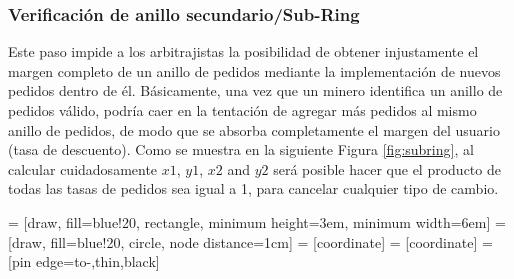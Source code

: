 \documentclass[UTF8,nofonts]{article}
\makeatletter
\newenvironment{figurehere}
 {\def\@captype{figure}}
 {}
\makeatother
\begin{document}
\begin{multicols}{2}
\subsubsection{Verificaci\'on de anillo secundario/Sub-Ring\label{sec:sub_ring_check}}
Este paso impide a los arbitrajistas la posibilidad de obtener injustamente el margen completo de un anillo de pedidos mediante la implementaci\'on de nuevos pedidos dentro de \'el. B\'asicamente, una vez que un minero identifica un anillo de pedidos v\'alido, podr\'ia caer en la tentaci\'on de agregar m\'as pedidos al mismo anillo de pedidos, de modo que se absorba completamente el margen del usuario (tasa de descuento). Como se muestra en la siguiente Figura \ref{fig:subring}, al calcular cuidadosamente $x1$, $y1$, $x2$ and $y2$ ser\'a posible hacer que el producto de todas las tasas de pedidos sea igual a 1, para cancelar cualquier tipo de cambio.

\begin{center}
\begin{figurehere}
\centering
{} = [draw, fill=blue!20, rectangle, 
    minimum height=3em, minimum width=6em]
 = [draw, fill=blue!20, circle, node distance=1cm]
 = [coordinate]
 = [coordinate]
 = [pin edge={to-,thin,black}]

\end{figurehere}
\end{center}
\end{multicols}
\end{document}
